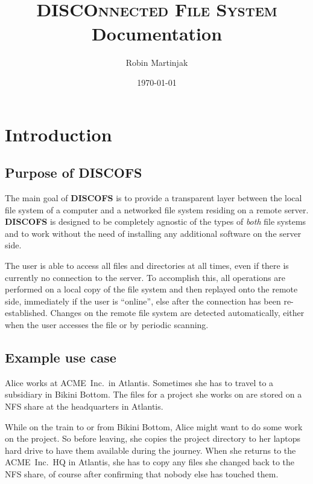\documentclass[a4paper]{article}
\title{\discofs \\ \textsc{\small \textbf{DISCO}nnected \textbf{F}ile \textbf{S}ystem} \\ Documentation}
\author{Robin Martinjak}
\date{\today}
\newcommand{\software}[1]{\textsc{\textbf{#1}}\xspace}
\newcommand{\discofs}{\software{DISCOFS}}
\begin{document}
\maketitle
\pagebreak

\tableofcontents
\pagebreak


\section{Introduction} %

\subsection{Purpose of \discofs} %
The main goal of \discofs is to provide a transparent layer between the local
file system of a computer and a networked file system residing on a remote
server. \discofs is designed to be completely agnostic of the types of
\emph{both} file systems and to work without the need of installing any
additional software on the server side.

The user is able to access all files and directories at all times, even if there
is currently no connection to the server. To accomplish this, all operations are
performed on a local copy of the file system and then replayed onto the remote
side, immediately if the user is ``online'', else after the connection has been
re-established. Changes on the remote file system are detected automatically,
either when the user accesses the file or by periodic scanning.

\subsection{Example use case} %
\newcommand{\somename}{Alice\xspace}
\newcommand{\somecompany}{ACME~Inc.\ }
\newcommand{\sometown}{Atlantis}
\newcommand{\anothertown}{Bikini Bottom}

\somename works at \somecompany in \sometown. Sometimes she has to travel
to a subsidiary in \anothertown. The files for a project she works on are
stored on a NFS share at the headquarters in \sometown.

While on the train to or from \anothertown, \somename might want to do some work
on the project. So before leaving, she copies the project directory to her
laptops hard drive to have them available during the journey. When she returns
to the \somecompany HQ in \sometown, she has to copy any files she changed back
to the NFS share, of course after confirming that nobody else has touched them.
\end{document}
